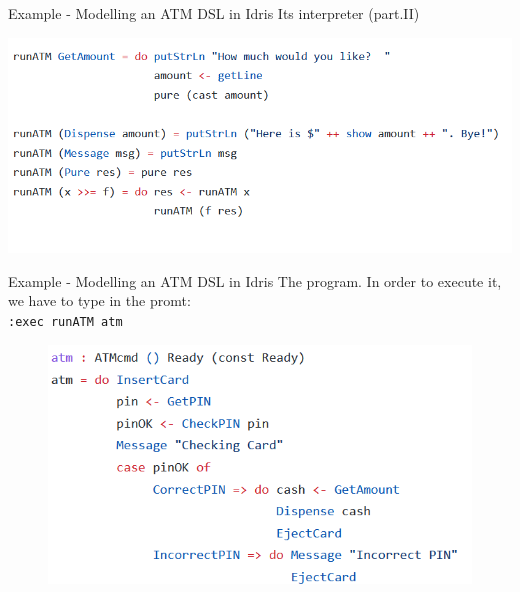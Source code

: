 \documentclass{beamer}
\newcommand{\dsltitle}{Example - Modelling an ATM DSL in Idris}
\begin{document}
\begin{frame}[fragile]{\dsltitle}
Its interpreter (part.II)
\begin{center}
	\includegraphics[width=\textwidth]{dsl-code-4_2}
\end{center}
\end{frame}

\begin{frame}[fragile]{\dsltitle}
The program. In order to execute it, we have to type in the promt:\\
\texttt{:exec runATM atm}
\begin{figure}
	\raggedright
  \includegraphics[scale=0.5]{dsl-code-5}
\end{figure}
\end{frame}
\end{document}
